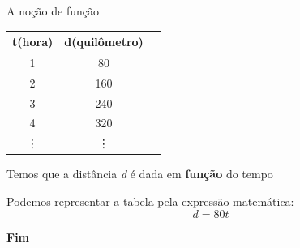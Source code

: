 \documentclass[aspectratio=169,xcolor=dvipsnames]{beamer}
\begin{document}
\begin{frame}{A noção de função}
  \begin{table}
    \begin{tabular}{c c c}
      \toprule
      \textbf{t(hora)} & \textbf{d(quilômetro)} \\
      \midrule
      1      & 80           \\
      2      & 160           \\
      3      & 240           \\
      4      & 320           \\
      \vdots      & \vdots           \\
      \bottomrule
    \end{tabular}
  \end{table}

  Temos que a distância \textit{d} é dada em \textbf{função} do tempo

  Podemos representar a tabela pela expressão matemática:
  \begin{equation*}
    d = 80t
  \end{equation*}
  
\end{frame}


%
%
%



\begin{frame}
    \Huge{\centerline{\textbf{Fim}}}
\end{frame}

\end{document}
